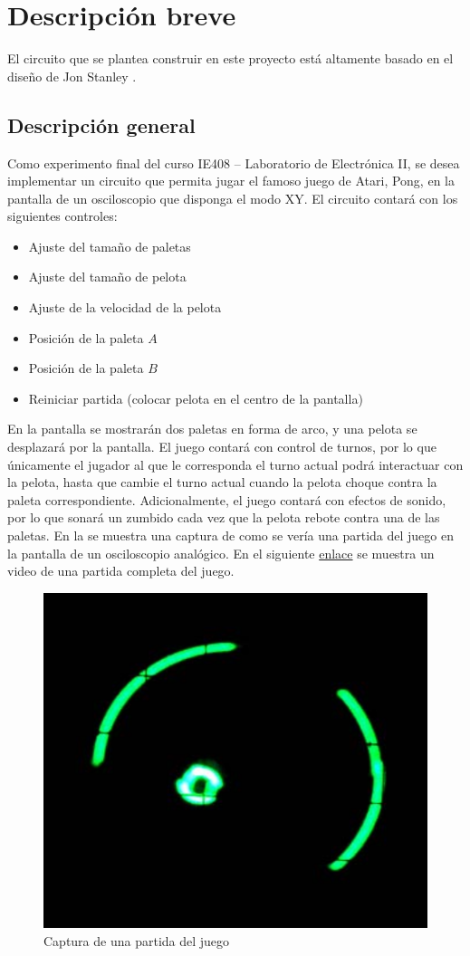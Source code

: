 \section{Descripción breve}
El circuito que se plantea construir en este proyecto está altamente basado en el diseño de Jon Stanley \cite{pong}.

\subsection{Descripción general}
Como experimento final del curso IE408 -- Laboratorio de Electrónica II, se desea implementar un circuito que permita jugar el famoso juego de Atari, Pong, en la pantalla de un osciloscopio que disponga el modo XY.
El circuito contará con los siguientes controles:
\begin{itemize}
    \item Ajuste del tamaño de paletas
    \item Ajuste del tamaño de pelota
    \item Ajuste de la velocidad de la pelota
    \item Posición de la paleta $A$
    \item Posición de la paleta $B$
    \item Reiniciar partida (colocar pelota en el centro de la pantalla)
\end{itemize}
En la pantalla se mostrarán dos paletas en forma de arco, y una pelota se desplazará por la pantalla.
El juego contará con control de turnos, por lo que únicamente el jugador al que le corresponda el turno actual podrá interactuar con la pelota, hasta que cambie el turno actual cuando la pelota choque contra la paleta correspondiente. 
Adicionalmente, el juego contará con efectos de sonido, por lo que sonará un zumbido cada vez que la pelota rebote contra una de las paletas. 
En la  se muestra una captura de como se vería una partida del juego en la pantalla de un osciloscopio analógico. 
En el siguiente \href{https://vimeo.com/671230800}{enlace} se muestra un video de una partida completa del juego. 

\begin{figure}[H]
    \centering
    \includegraphics[width=0.5\linewidth]{figs/descripcion/juego.png}
    \caption{Captura de una partida del juego \cite{pong}}
    \label{ejemploJuego}
\end{figure}
